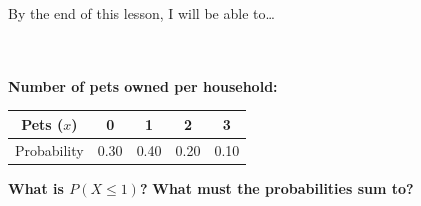 \documentclass[10pt]{article}
\begin{document}
\namedateperiod

\vspace{0.12in}

\begin{objectivebox}
\small By the end of this lesson, I will be able to\dots\\[4pt]
\writeline\\[1pt]
\writeline\\[1pt]
\writeline
\end{objectivebox}

\vspace{0.1in}

\begin{vocabbox}
\end{vocabbox}

\vspace{0.1in}

\begin{hookbox}
\small\textbf{Number of pets owned per household:}
\begin{center}
\renewcommand{\arraystretch}{1.3}
\begin{tabular}{@{}ccccc@{}}
Pets ($x$) & 0 & 1 & 2 & 3 \\
\hline
Probability & 0.30 & 0.40 & 0.20 & 0.10 \\
\end{tabular}
\end{center}
\textbf{What is $P(X \le 1)$?} \quad \blank{4cm} \quad
\textbf{What must the probabilities sum to?} \quad \blank{3cm}
\end{hookbox}

\vspace{0.1in}
\end{document}
